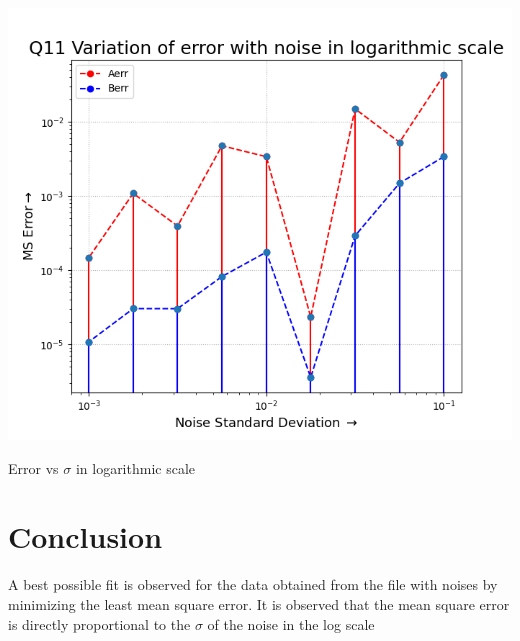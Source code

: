 \documentclass[12pt, a4paper]{report}
\begin{document}
\begin{center}
	\includegraphics[scale=0.85]{Figure_4} 
	\caption{Error vs $\sigma$ in logarithmic scale}
	\label{fig:rawdata}
\end{center}

\section*{Conclusion}
A best possible fit is observed for the data obtained from the file with noises by minimizing the least mean square error. It is observed that the mean square error is directly proportional to the 
$\sigma$ of the noise in the log scale
\end{document}
